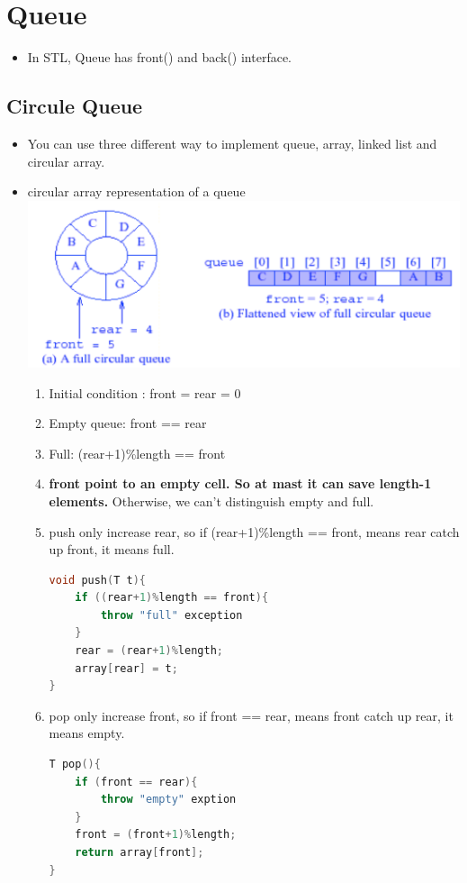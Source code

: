\documentclass[a4paper,11pt,twoside]{book}
\begin{document}
\section{Queue}
\begin{itemize}
\item In STL, Queue has front() and back() interface. 

\end{itemize}


\subsection{Circule Queue}
\begin{itemize}
	
\item You can use three different way to implement queue, array, linked list and circular array.
	
\item circular array representation of a queue
\includegraphics[scale=0.35]{pics/cd.png} \newline
\begin{enumerate}
\item Initial condition : front = rear = 0
\item Empty queue:     front == rear
\item Full: (rear+1)\%length == front
\item \textbf{front point to an empty cell. So at mast it can save length-1 elements. } Otherwise, we can't distinguish empty and full.

\item push only increase rear, so if (rear+1)\%length == front, means rear catch up front, it means full. 
\begin{lstlisting}[frame=single, language=c++]
void push(T t){
	if ((rear+1)%length == front){
		throw "full" exception
	}
	rear = (rear+1)%length;
	array[rear] = t;
}	
\end{lstlisting}

\item pop only increase front, so if front == rear, means front catch up rear, it means empty.
\begin{lstlisting}[frame=single, language=c++]
T pop(){
	if (front == rear){
		throw "empty" exption
	}
	front = (front+1)%length;
	return array[front];
}
\end{lstlisting}

\end{enumerate}

\end{itemize}
\end{document}
